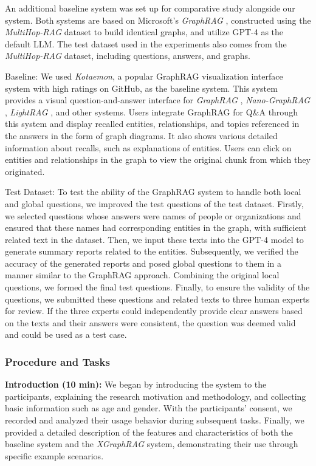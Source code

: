 An additional baseline system was set up for comparative study \cite{feng2023promptmagician, feng2023xnli} alongside our system. Both systems are based on Microsoft's \textit{GraphRAG} \cite{edge2024local}, constructed using the \textit{MultiHop-RAG} dataset to build identical graphs, and utilize GPT-4 as the default LLM. The test dataset used in the experiments also comes from the \textit{MultiHop-RAG} dataset, including questions, answers, and graphs.

Baseline: We used \textit{Kotaemon}, a popular GraphRAG visualization interface system with high ratings on GitHub, as the baseline system. This system provides a visual question-and-answer interface for \textit{GraphRAG} \cite{edge2024local}, \textit{Nano-GraphRAG} \cite{gusye2024nanographrag}, \textit{LightRAG} \cite{guo2024lightrag}, and other systems. Users integrate GraphRAG for Q\&A through this system and display recalled entities, relationships, and topics referenced in the answers in the form of graph diagrams. It also shows various detailed information about recalls, such as explanations of entities. Users can click on entities and relationships in the graph to view the original chunk from which they originated.

Test Dataset: To test the ability of the GraphRAG system to handle both local and global questions, we improved the test questions of the test dataset. Firstly, we selected questions whose answers were names of people or organizations and ensured that these names had corresponding entities in the graph, with sufficient related text in the dataset. Then, we input these texts into the GPT-4 model to generate summary reports related to the entities. Subsequently, we verified the accuracy of the generated reports and posed global questions to them in a manner similar to the GraphRAG approach. Combining the original local questions, we formed the final test questions. Finally, to ensure the validity of the questions, we submitted these questions and related texts to three human experts for review. If the three experts could independently provide clear answers based on the texts and their answers were consistent, the question was deemed valid and could be used as a test case.

\subsubsection{Procedure and Tasks}

\textbf{Introduction (10 min):} We began by introducing the system to the participants, explaining the research motivation and methodology, and collecting basic information such as age and gender. With the participants' consent, we recorded and analyzed their usage behavior during subsequent tasks. Finally, we provided a detailed description of the features and characteristics of both the baseline system and the \textit{XGraphRAG} \cite{edge2024local} system, demonstrating their use through specific example scenarios.

